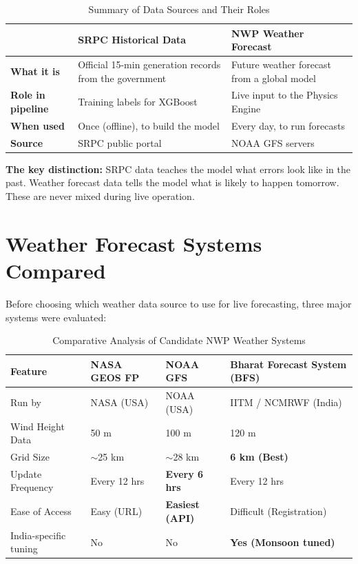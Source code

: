 \documentclass[12pt,a4paper]{report}
\begin{document}
\begin{table}[H]
    \centering
    \caption{Summary of Data Sources and Their Roles}
    \begin{tabular}{p{3.5cm}p{4.5cm}p{4.5cm}}
        \toprule
        & \textbf{SRPC Historical Data} & \textbf{NWP Weather Forecast} \\
        \midrule
        \textbf{What it is} & Official 15-min generation records from the government & Future weather forecast from a global model \\
        \textbf{Role in pipeline} & Training labels for XGBoost & Live input to the Physics Engine \\
        \textbf{When used} & Once (offline), to build the model & Every day, to run forecasts \\
        \textbf{Source} & SRPC public portal & NOAA GFS servers \\
        \bottomrule
    \end{tabular}
\end{table}

\textbf{The key distinction:} SRPC data teaches the model what errors look like in the past. Weather forecast data tells the model what is likely to happen tomorrow. These are never mixed during live operation.

\section{Weather Forecast Systems Compared}

Before choosing which weather data source to use for live forecasting, three major systems were evaluated:

\begin{table}[H]
    \centering
    \caption{Comparative Analysis of Candidate NWP Weather Systems}
    \begin{tabular}{p{3.8cm}p{2.8cm}p{2.8cm}p{3.2cm}}
        \toprule
        \textbf{Feature} & \textbf{NASA GEOS FP} & \textbf{NOAA GFS} & \textbf{Bharat Forecast System (BFS)} \\
        \midrule
        Run by & NASA (USA) & NOAA (USA) & IITM / NCMRWF (India) \\
        Wind Height Data & 50 m & 100 m & 120 m \\
        Grid Size & $\sim$25 km & $\sim$28 km & \textbf{6 km (Best)} \\
        Update Frequency & Every 12 hrs & \textbf{Every 6 hrs} & Every 12 hrs \\
        Ease of Access & Easy (URL) & \textbf{Easiest (API)} & Difficult (Registration) \\
        India-specific tuning & No & No & \textbf{Yes (Monsoon tuned)} \\
        \bottomrule
    \end{tabular}
\end{table}
\end{document}

